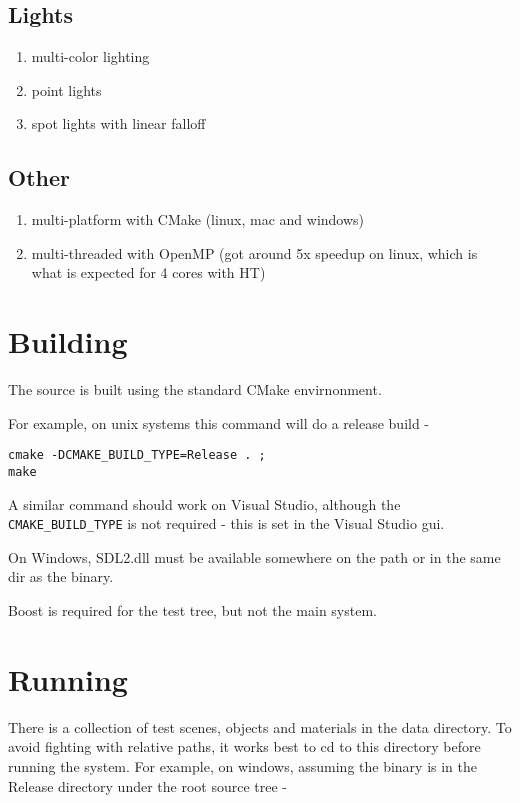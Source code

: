 \subsection{Lights}
    \begin{enumerate}
    \item multi-color lighting
    \item point lights
    \item spot lights with linear falloff
    \end{enumerate}

\subsection{Other}
    \begin{enumerate}
    \item multi-platform with CMake (linux, mac and windows)
    \item multi-threaded with OpenMP (got around 5x speedup on linux, which is what is expected for 4 cores with HT)
    \end{enumerate}

\section{Building}

The source is built using the standard CMake envirnonment.

For example, on unix systems this command will do a release build -

\verb|cmake -DCMAKE_BUILD_TYPE=Release . ;| \\
\verb|make|

A similar command should work on Visual Studio, although the \verb|CMAKE_BUILD_TYPE| is not required - this is set in the Visual Studio gui.

On Windows, SDL2.dll must be available somewhere on the path or in the same dir as the binary. 

Boost is required for the test tree, but not the main system.

\section{Running}

There is a collection of test scenes, objects and materials in the data directory. To avoid fighting with relative paths, it works best to cd to this directory before running the system. For example, on windows, assuming the binary is in the Release directory under the root source tree - 

